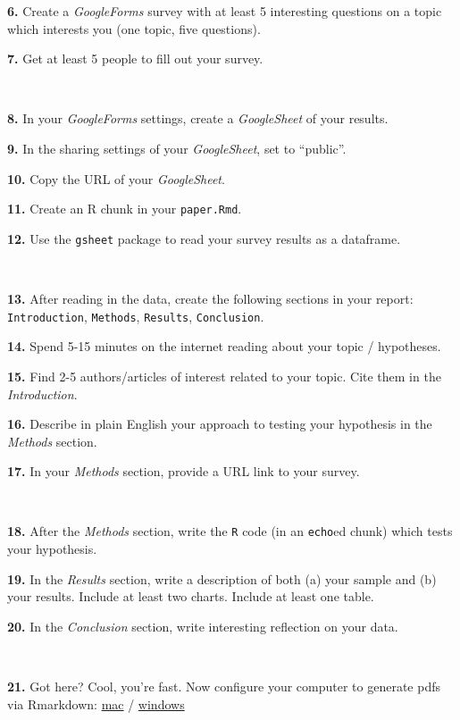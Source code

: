 \documentclass[]{book}
\begin{document}
\textbf{6.} Create a \emph{GoogleForms} survey with at least 5 interesting questions on a topic which interests you (one topic, five questions).

\textbf{7.} Get at least 5 people to fill out your survey.

~

\textbf{8.} In your \emph{GoogleForms} settings, create a \emph{GoogleSheet} of your results.

\textbf{9.} In the sharing settings of your \emph{GoogleSheet}, set to ``public''.

\textbf{10.} Copy the URL of your \emph{GoogleSheet}.

\textbf{11.} Create an R chunk in your \texttt{paper.Rmd}.

\textbf{12.} Use the \texttt{gsheet} package to read your survey results as a dataframe.

~

\textbf{13.} After reading in the data, create the following sections in your report: \texttt{Introduction}, \texttt{Methods}, \texttt{Results}, \texttt{Conclusion}.

\textbf{14.} Spend 5-15 minutes on the internet reading about your topic / hypotheses.

\textbf{15.} Find 2-5 authors/articles of interest related to your topic. Cite them in the \emph{Introduction}.

\textbf{16.} Describe in plain English your approach to testing your hypothesis in the \emph{Methods} section.

\textbf{17.} In your \emph{Methods} section, provide a URL link to your survey.

~

\textbf{18.} After the \emph{Methods} section, write the \texttt{R} code (in an \texttt{echo}ed chunk) which tests your hypothesis.

\textbf{19.} In the \emph{Results} section, write a description of both (a) your sample and (b) your results. Include at least two charts. Include at least one table.

\textbf{20.} In the \emph{Conclusion} section, write interesting reflection on your data.

~

\textbf{21.} Got here? Cool, you're fast. Now configure your computer to generate pdfs via Rmarkdown: \href{https://medium.com/@sorenlind/create-pdf-reports-using-r-r-markdown-latex-and-knitr-on-macos-high-sierra-e7b5705c9fd}{mac} / \href{https://medium.com/@sorenlind/create-pdf-reports-using-r-r-markdown-latex-and-knitr-on-windows-10-952b0c48bfa9}{windows}
\end{document}

